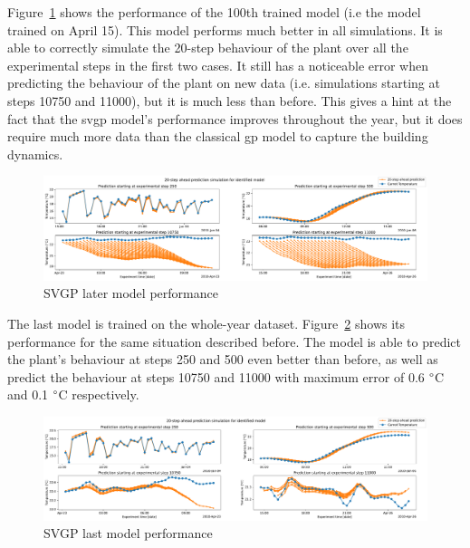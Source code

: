 \clearpage

Figure~\ref{fig:SVGP_later_model_performance} shows the performance of the 100th
trained model (i.e the model trained on April 15). This model performs much
better in all simulations. It is able to correctly simulate the 20-step
behaviour of the plant over all the experimental steps in the first two cases.
It still has a noticeable error when predicting the behaviour of the plant on
new data (i.e. simulations starting at steps 10750 and 11000), but it is much
less than before. This gives a hint at the fact that the \acrshort{svgp} model's
performance improves throughout the year, but it does require much more data
than the classical \acrshort{gp} model to capture the building dynamics.

\begin{figure}[ht]
    \centering
    \includegraphics[width =
    \textwidth]{Plots/1_SVGP_480pts_inf_window_12_averageYear_later_model_performance.pdf}
    \caption{SVGP later model performance}
    \label{fig:SVGP_later_model_performance}
\end{figure}

The last model is trained on the whole-year dataset.
Figure~\ref{fig:SVGP_last_model_performance} shows its performance for the same
situation described before. The model is able to predict the plant's behaviour
at steps 250 and 500 even better than before, as well as predict the behaviour
at steps 10750 and 11000 with maximum error of 0.6 $\degree$C and 0.1 $\degree$C
respectively.

\begin{figure}[ht]
    \centering
    \includegraphics[width =
    \textwidth]{Plots/1_SVGP_480pts_inf_window_12_averageYear_last_model_performance.pdf}
    \caption{SVGP last model performance}
    \label{fig:SVGP_last_model_performance}
\end{figure}

